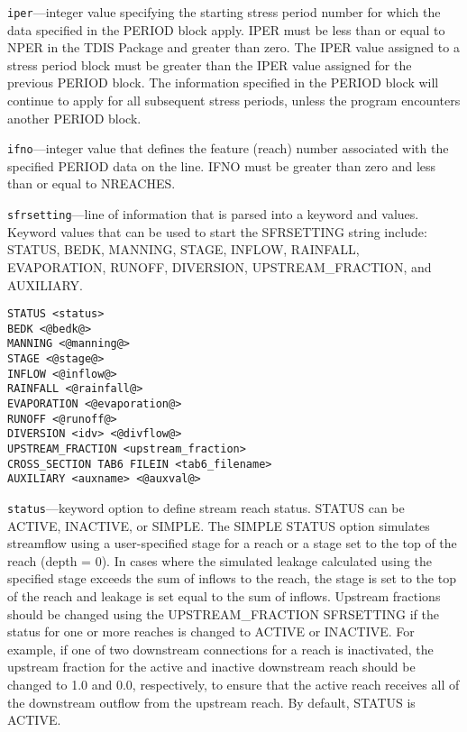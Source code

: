 \begin{description}
\item \texttt{iper}---integer value specifying the starting stress period number for which the data specified in the PERIOD block apply.  IPER must be less than or equal to NPER in the TDIS Package and greater than zero.  The IPER value assigned to a stress period block must be greater than the IPER value assigned for the previous PERIOD block.  The information specified in the PERIOD block will continue to apply for all subsequent stress periods, unless the program encounters another PERIOD block.

\item \texttt{ifno}---integer value that defines the feature (reach) number associated with the specified PERIOD data on the line. IFNO must be greater than zero and less than or equal to NREACHES.

\item \texttt{sfrsetting}---line of information that is parsed into a keyword and values.  Keyword values that can be used to start the SFRSETTING string include: STATUS, BEDK, MANNING, STAGE, INFLOW, RAINFALL, EVAPORATION, RUNOFF, DIVERSION, UPSTREAM\_FRACTION, and AUXILIARY.

\begin{lstlisting}[style=blockdefinition]
STATUS <status>
BEDK <@bedk@>
MANNING <@manning@>
STAGE <@stage@>
INFLOW <@inflow@>
RAINFALL <@rainfall@>
EVAPORATION <@evaporation@>
RUNOFF <@runoff@>
DIVERSION <idv> <@divflow@> 
UPSTREAM_FRACTION <upstream_fraction>
CROSS_SECTION TAB6 FILEIN <tab6_filename> 
AUXILIARY <auxname> <@auxval@> 
\end{lstlisting}

\item \texttt{status}---keyword option to define stream reach status.  STATUS can be ACTIVE, INACTIVE, or SIMPLE. The SIMPLE STATUS option simulates streamflow using a user-specified stage for a reach or a stage set to the top of the reach (depth = 0). In cases where the simulated leakage calculated using the specified stage exceeds the sum of inflows to the reach, the stage is set to the top of the reach and leakage is set equal to the sum of inflows. Upstream fractions should be changed using the UPSTREAM\_FRACTION SFRSETTING if the status for one or more reaches is changed to ACTIVE or INACTIVE. For example, if one of two downstream connections for a reach is inactivated, the upstream fraction for the active and inactive downstream reach should be changed to 1.0 and 0.0, respectively, to ensure that the active reach receives all of the downstream outflow from the upstream reach. By default, STATUS is ACTIVE.


\end{description}
